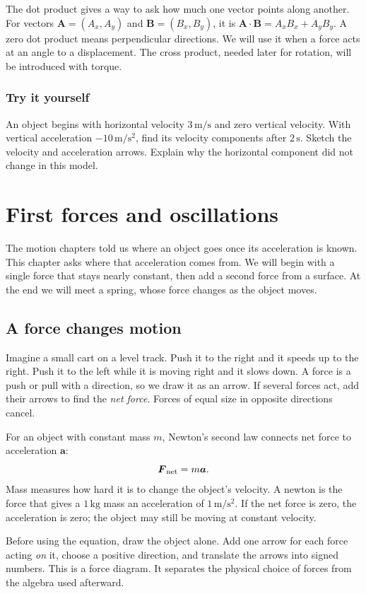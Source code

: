 \documentclass[11pt,oneside]{book}
\newcommand{\vect}[1]{\boldsymbol{#1}}
\theoremstyle{reviewstyle}
\newcommand{\learningcheck}[1]{\subsection*{Try it yourself}\noindent #1\par}
\begin{document}
The dot product gives a way to ask how much one vector points along another. For vectors $\vect A=(A_x,A_y)$ and $\vect B=(B_x,B_y)$, it is $\vect A\cdot\vect B=A_xB_x+A_yB_y$. A zero dot product means perpendicular directions. We will use it when a force acts at an angle to a displacement. The cross product, needed later for rotation, will be introduced with torque.

\learningcheck{An object begins with horizontal velocity $3\,\mathrm{m/s}$ and zero vertical velocity. With vertical acceleration $-10\,\mathrm{m/s^2}$, find its velocity components after $2\,\mathrm s$. Sketch the velocity and acceleration arrows. Explain why the horizontal component did not change in this model.}

\chapter{First forces and oscillations}
The motion chapters told us where an object goes once its acceleration is known. This chapter asks where that acceleration comes from. We will begin with a single force that stays nearly constant, then add a second force from a surface. At the end we will meet a spring, whose force changes as the object moves.

\section{A force changes motion}
Imagine a small cart on a level track. Push it to the right and it speeds up to the right. Push it to the left while it is moving right and it slows down. A force is a push or pull with a direction, so we draw it as an arrow. If several forces act, add their arrows to find the \emph{net force}. Forces of equal size in opposite directions cancel.

For an object with constant mass $m$, Newton's second law connects net force to acceleration $\vect a$:
\begin{equation}
\vect F_{\rm net}=m\vect a.
\end{equation}
Mass measures how hard it is to change the object's velocity. A newton is the force that gives a $1\,\mathrm{kg}$ mass an acceleration of $1\,\mathrm{m/s^2}$. If the net force is zero, the acceleration is zero; the object may still be moving at constant velocity.

Before using the equation, draw the object alone. Add one arrow for each force acting \emph{on} it, choose a positive direction, and translate the arrows into signed numbers. This is a force diagram. It separates the physical choice of forces from the algebra used afterward.
\end{document}
